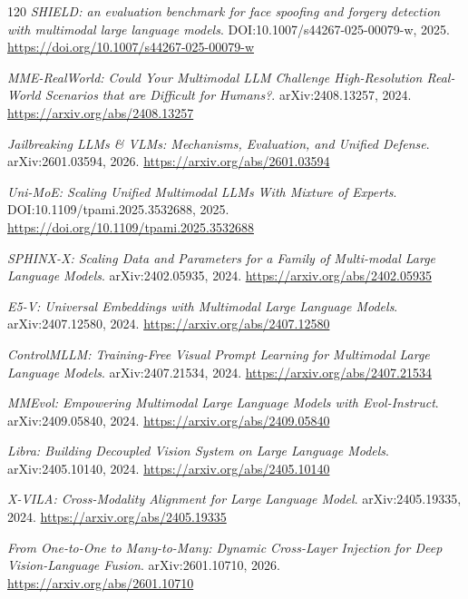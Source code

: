 \documentclass[11pt,a4paper]{article}
\begin{document}
\begin{thebibliography}{120}
\newblock \emph{SHIELD: an evaluation benchmark for face spoofing and forgery detection with multimodal large language models}.
\newblock DOI:10.1007/s44267-025-00079-w, 2025.
\newblock \url{https://doi.org/10.1007/s44267-025-00079-w}

\newblock \emph{MME-RealWorld: Could Your Multimodal LLM Challenge High-Resolution Real-World Scenarios that are Difficult for Humans?}.
\newblock arXiv:2408.13257, 2024.
\newblock \url{https://arxiv.org/abs/2408.13257}

\newblock \emph{Jailbreaking LLMs \& VLMs: Mechanisms, Evaluation, and Unified Defense}.
\newblock arXiv:2601.03594, 2026.
\newblock \url{https://arxiv.org/abs/2601.03594}

\newblock \emph{Uni-MoE: Scaling Unified Multimodal LLMs With Mixture of Experts}.
\newblock DOI:10.1109/tpami.2025.3532688, 2025.
\newblock \url{https://doi.org/10.1109/tpami.2025.3532688}

\newblock \emph{SPHINX-X: Scaling Data and Parameters for a Family of Multi-modal Large Language Models}.
\newblock arXiv:2402.05935, 2024.
\newblock \url{https://arxiv.org/abs/2402.05935}

\newblock \emph{E5-V: Universal Embeddings with Multimodal Large Language Models}.
\newblock arXiv:2407.12580, 2024.
\newblock \url{https://arxiv.org/abs/2407.12580}

\newblock \emph{ControlMLLM: Training-Free Visual Prompt Learning for Multimodal Large Language Models}.
\newblock arXiv:2407.21534, 2024.
\newblock \url{https://arxiv.org/abs/2407.21534}

\newblock \emph{MMEvol: Empowering Multimodal Large Language Models with Evol-Instruct}.
\newblock arXiv:2409.05840, 2024.
\newblock \url{https://arxiv.org/abs/2409.05840}

\newblock \emph{Libra: Building Decoupled Vision System on Large Language Models}.
\newblock arXiv:2405.10140, 2024.
\newblock \url{https://arxiv.org/abs/2405.10140}

\newblock \emph{X-VILA: Cross-Modality Alignment for Large Language Model}.
\newblock arXiv:2405.19335, 2024.
\newblock \url{https://arxiv.org/abs/2405.19335}

\newblock \emph{From One-to-One to Many-to-Many: Dynamic Cross-Layer Injection for Deep Vision-Language Fusion}.
\newblock arXiv:2601.10710, 2026.
\newblock \url{https://arxiv.org/abs/2601.10710}


\end{thebibliography}
\end{document}
